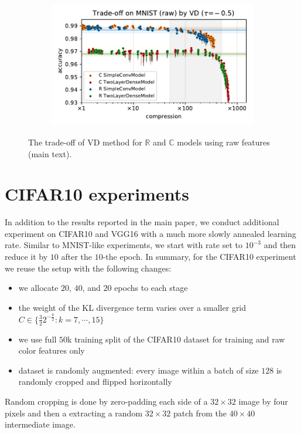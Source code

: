 \documentclass[a4paper]{extarticle}
\newcommand{\real}{\mathbb{R}}
\newcommand{\cplx}{\mathbb{C}}
\begin{document}
\begin{figure}[ht]
\begin{subfigure}[b]{0.5\textwidth}
  \end{subfigure}%
  \begin{subfigure}[b]{0.5\textwidth}
    \centering
    \includegraphics[width=\linewidth]{../figure__mnist-like__trade-off/legacy__VD__mnist__raw__-0.5.pdf}
  \end{subfigure}
  \caption{%
    The trade-off of VD method for $\real$ and $\cplx$ models using raw features (main text).
  }
  \label{fig:paper__mnist-like__trade-off__VD__raw}
\end{figure}


\clearpage

\section{CIFAR10 experiments} %
\label{sec:cifar_experiments}

In addition to the results reported in the main paper, we conduct additional experiment
on CIFAR10 and VGG16 with a much more slowly annealed learning rate. Similar to MNIST-like
experiments, we start with rate set to $10^{-3}$ and then reduce it by $10$ after the
$10$-the epoch. In summary, for the CIFAR10 experiment we reuse the setup with the following
changes:
\begin{itemize}
  \item we allocate $20$, $40$, and $20$ epochs to each stage
  \item the weight of the KL divergence term varies over a smaller grid $
    C \in \{
      \tfrac32 2^{-\tfrac{k}2} \colon k=7, \cdots, 15
    \}
  $
  \item we use full $50$k training split of the CIFAR10 dataset for training and raw color
  features only
  \item dataset is randomly augmented: every image within a batch of size $128$ is randomly
  cropped and flipped horizontally
\end{itemize}
Random cropping is done by zero-padding each side of a $32\times 32$ image by four pixels
and then a extracting a random $32\times 32$ patch from the $40\times 40$ intermediate image.
\end{document}
